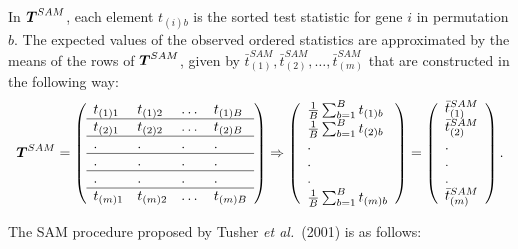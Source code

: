 In $\mbox{\boldmath $T$}^{SAM}$, each element $t_{(i)b}$ is the sorted test statistic
for gene $i$ in permutation $b$. The expected values of the observed
ordered statistics are approximated by the means of the rows of
$\mbox{\boldmath $T$}^{SAM}$, given by $\bar{t}_{(1)}^{SAM}, \bar{t}_{(2)}^{SAM},
\dots, \bar{t}_{(m)}^{SAM}$ that are constructed in the following
way:
\[
\mbox{\boldmath $T$}^{SAM}= \left (
\begin{array}{llll}
t_{(1)1} & t_{(1)2} & \dots & t_{(1)B}\\ \hline t_{(2)1}
& t_{(2)2} & \dots & t_{(2)B}\\ \hline .    & . &.      & .
\\ \hline .    & .    &.      & .     \\ \hline . & .    &.      & .
\\ \hline
t_{(m)1} & t_{(m)2} & \dots & t_{(m)B}\\
\end{array}
\right ) \Rightarrow \left (
\begin{array}{l}
\frac{1}{B}\sum_{b=1}^{B}t_{(1)b} \\
\frac{1}{B}\sum_{b=1}^{B}t_{(2)b} \\
.                                     \\
.                                     \\
.                                     \\
\frac{1}{B}\sum_{b=1}^{B}t_{(m)b} \\
\end{array}
\right ) = \left (
\begin{array}{l}
\bar{t}_{(1)}^{SAM} \\
\bar{t}_{(2)}^{SAM} \\
.                                     \\
.                                     \\
.                                     \\
\bar{t}_{(m)}^{SAM} \\
\end{array}
\right ).
\]


The SAM procedure proposed by Tusher \textit{et al.}\ (2001) is as
follows:

